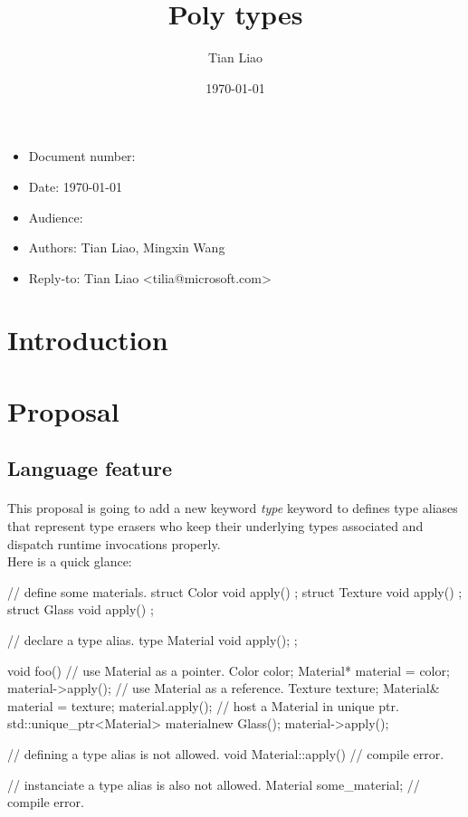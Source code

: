 \documentclass{article}
\title{Poly types}
\author{Tian Liao}
\date{\today}
\begin{document}
\maketitle
\vfill
\begin{itemize}[noitemsep]
  \item[] Document number:
  \item[] Date: \today
  \item[] Audience:
  \item[] Authors: Tian Liao, Mingxin Wang
  \item[] Reply-to: Tian Liao \textless tilia@microsoft.com\textgreater
\end{itemize}

\newpage
{}

\section{Introduction}

\section{Proposal}

\subsection{Language feature}
\paragraph{}
This proposal is going to add a new keyword \textit{type} keyword to defines
type aliases that represent type erasers who keep their underlying types associated and dispatch
runtime invocations properly.\\
Here is a quick glance:
\begin{codeblock}
// define some materials.
struct Color { void apply() {} };
struct Texture { void apply() {} };
struct Glass { void apply() {} };

// declare a type alias.
type Material { void apply(); };

void foo() {
  {
    // use Material as a pointer.
    Color color;
    Material* material = color;
    material->apply();
  }
  {
    // use Material as a reference.
    Texture texture;
    Material& material = texture;
    material.apply();
  }
  {
    // host a Material in unique ptr.
    std::unique_ptr<Material> material{new Glass()};
    material->apply();
  }
}

// defining a type alias is not allowed.
void Material::apply() {} // compile error.

// instanciate a type alias is also not allowed.
Material some_material; // compile error.

\end{codeblock}
\end{document}
